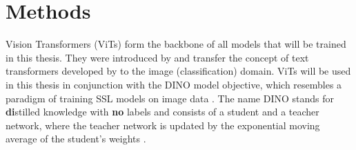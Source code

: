 \section{Methods}
Vision Transformers (ViTs) form the backbone of all models that will be trained in this thesis.
They were introduced by \citep{Dosovitskiy2020} and transfer the concept of text transformers developed by \citep{Vaswani2017} to the image (classification) domain.
ViTs will be used in this thesis in conjunction with the DINO model objective, which resembles a paradigm of training SSL models on image data \citep{Caron2021}.
The name DINO stands for \textbf{di}stilled knowledge with \textbf{no} labels and consists of a student and a teacher network, where the teacher network is updated by the exponential moving average of the student's weights \citep{Caron2021}.

